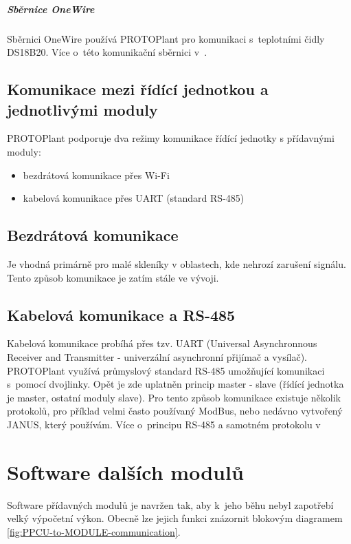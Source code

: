\paragraph{Sběrnice OneWire}
Sběrnici OneWire používá PROTOPlant pro komunikaci s~teplotními čidly DS18B20. 
Více o~této komunikační sběrnici v~\cite{DS18B20}.

\section{Komunikace mezi řídící jednotkou a jednotlivými moduly}
PROTOPlant podporuje dva režimy komunikace řídící jednotky s přídavnými moduly:
\begin{itemize}
    \item bezdrátová komunikace přes Wi-Fi
    \item kabelová komunikace přes UART (standard RS-485)
\end{itemize}

\section{Bezdrátová komunikace}
Je vhodná primárně pro malé skleníky v oblastech, kde nehrozí zarušení signálu.
Tento způsob komunikace je zatím stále ve vývoji.

\section{Kabelová komunikace a RS-485}
Kabelová komunikace probíhá přes tzv. UART (Universal Asynchronnous Receiver and Transmitter - univerzální asynchronní přijímač a vysílač).
PROTOPlant využívá průmyslový standard RS-485 umožňující komunikaci s~pomocí dvojlinky.
Opět je zde uplatněn princip master - slave (řídící jednotka je master, ostatní moduly slave).
Pro tento způsob komunikace existuje několik protokolů, pro příklad velmi často používaný ModBus, nebo nedávno vytvořený JANUS\cite{JANUS}, který používám. 
Více o~principu RS-485 a samotném protokolu v~\cite[21-25]{JANUS}

\chapter{Software dalších modulů}

\label{chap:moduleSoftware}
Software přídavných modulů je navržen tak, aby k~jeho běhu nebyl zapotřebí velký výpočetní výkon.
Obecně lze jejich funkci znázornit blokovým diagramem \ref{fig:PPCU-to-MODULE-communication}.

